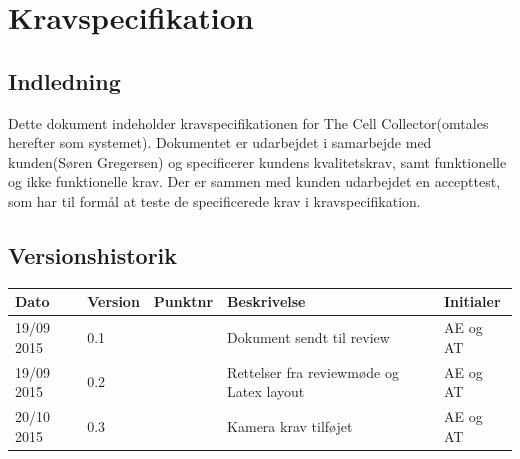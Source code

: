 \chapter{Kravspecifikation}

\section{Indledning}
Dette dokument indeholder kravspecifikationen for The Cell Collector(omtales herefter som systemet). Dokumentet er udarbejdet i samarbejde med kunden(Søren Gregersen) og specificerer kundens kvalitetskrav, samt funktionelle og ikke funktionelle krav. Der er sammen med kunden udarbejdet en accepttest, som har til formål at teste de specificerede krav i kravspecifikation.
\section{Versionshistorik}
\begin{center}
		\begin{longtable}{ | m{2.5cm} | m{2.5cm}| m{2.5cm}| m{2.5cm}| m{2.5cm}| } 
			\hline
			\textbf{Dato} & \textbf{Version} & \textbf{Punktnr} & \textbf{Beskrivelse} & \textbf{Initialer}  \\ 
			\hline
			19/09 2015 &  0.1 & & Dokument sendt til review & AE og AT \\
			\hline
		19/09 2015 &  0.2 & & Rettelser fra reviewmøde og Latex layout & AE og AT \\
		\hline
		20/10 2015 &  0.3 & & Kamera krav tilføjet & AE og AT \\
			\hline
		\end{longtable}
		
	\end{center}

\newpage
